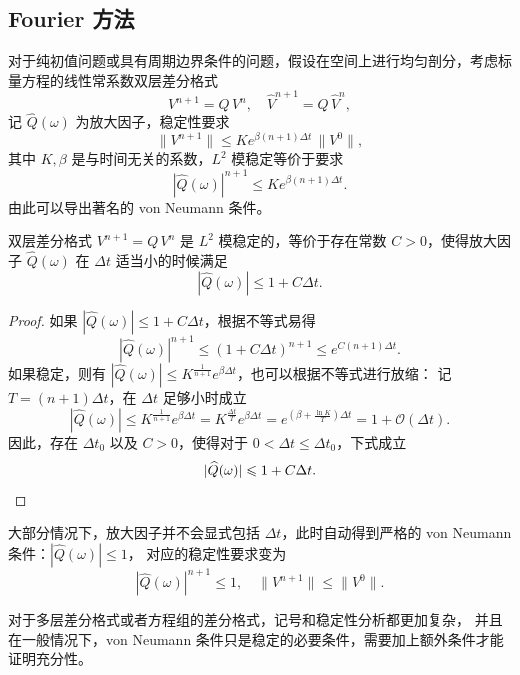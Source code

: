 \subsection{Fourier 方法}

对于纯初值问题或具有周期边界条件的问题，假设在空间上进行均匀剖分，考虑标量方程的线性常系数双层差分格式
\[
    V^{n+1} = Q \, V^n,\quad \widehat{V}^{n+1} = \widehat{Q} \, \widehat{V}^n,
\]
记 $\widehat{Q}(\omega)$ 为放大因子，稳定性要求
\[
    \| V^{n+1}\|\le K e^{\beta(n+1)\Delta t} \,\| V^0\|,
\]
其中 $K,\beta$ 是与时间无关的系数，$L^2$ 模稳定等价于要求
\[
    |\widehat{Q}(\omega)|^{n+1} \le K e^{\beta(n+1)\Delta t}.
\]
由此可以导出著名的 von Neumann 条件。

\begin{theorem}
    双层差分格式 $V^{n+1} = Q \, V^n$ 是 $L^2$ 模稳定的，等价于存在常数 $C>0$，使得放大因子 $\widehat{Q}(\omega)$ 在 $\Delta t$ 适当小的时候满足
    \[
        |\widehat{Q}(\omega)| \le 1+C \Delta t.
    \]
\end{theorem}

\begin{proof}
    如果 $|\widehat{Q}(\omega)| \le 1 + C \Delta t$，根据不等式易得
    \[
        |\widehat{Q}(\omega)|^{n+1} \le (1 + C \Delta t)^{n+1} \le e^{C (n+1)\Delta t}.
    \]
    如果稳定，则有 $|\widehat{Q}(\omega)|  \le K^{\frac{1}{n+1}} e^{\beta \Delta t}$，也可以根据不等式进行放缩：
    记 $T = (n+1)\Delta t$，在 $\Delta t$ 足够小时成立
    \[
        |\widehat{Q}(\omega)|  \le K^{\frac{1}{n+1}} e^{\beta \Delta t}
        = K^{\frac{\Delta t}{T}} e^{\beta \Delta t}
        = e^{(\beta + \frac{\ln K}{T})\Delta t}
        = 1 + \mathcal{O}(\Delta t).
    \]
    因此，存在 $\Delta t_0$ 以及 $C>0$，使得对于 $0 < \Delta t \le \Delta t_0$，下式成立
    \[
        |\widehat{Q}(\omega)| \le 1+C \Delta t. \qedhere
    \]
\end{proof}

\begin{remark}
    大部分情况下，放大因子并不会显式包括 $\Delta t$，此时自动得到严格的 von Neumann 条件：$|\widehat{Q}(\omega)| \le 1$，
    对应的稳定性要求变为
    \[
        |\widehat{Q}(\omega)|^{n+1} \le 1,\quad
        \| V^{n+1}\|\le  \| V^0\|.
    \]
\end{remark}

\begin{remark}
    对于多层差分格式或者方程组的差分格式，记号和稳定性分析都更加复杂，
    并且在一般情况下，von Neumann 条件只是稳定的必要条件，需要加上额外条件才能证明充分性。
\end{remark}

